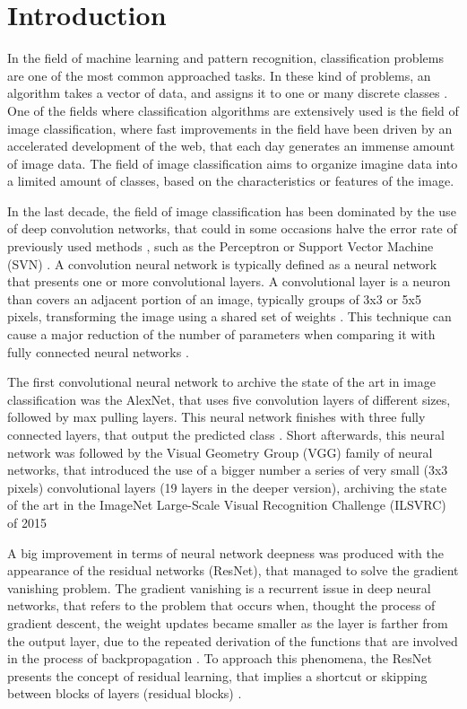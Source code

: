 \documentclass[11pt,onecolumn,titlepage,letterpaper]{article}
\begin{document}
\section{Introduction}

In the field of machine learning  and pattern recognition, classification problems are one of the most common approached tasks. In these kind of problems, an algorithm takes a vector of data, and assigns it to one or many discrete classes \cite{Bishop2006}. One of the fields where classification algorithms are extensively used is the field of image classification, where fast improvements in the field have been driven by an accelerated development of the web, that each day generates an immense amount of image data. The field of image classification aims to organize imagine data into a limited amount of classes, based on the characteristics or features of the image. \cite{Zhang2019}

In the last decade, the field of image classification has been dominated by the use of deep convolution networks, that could in some occasions halve the error rate of previously used methods \cite{Krizhevsky2017}, such as the Perceptron \cite{Rosenblatt1957} or Support Vector Machine (SVN) \cite{Vapnik1995}. A convolution neural network is typically defined as a neural network that presents one or more convolutional layers. A convolutional layer is a neuron than covers an adjacent portion of an image, typically groups of 3x3 or 5x5 pixels, transforming the image using a shared set of weights . This technique can cause a major reduction of the number of parameters when comparing it with fully connected neural networks \cite{Aghdam2017}.

The first convolutional neural network to archive the state of the art in image classification was the AlexNet, that uses five convolution layers of different sizes, followed by max pulling layers. This neural network finishes with three fully connected layers, that output the predicted class \cite{Krizhevsky2012}. Short afterwards, this neural network was followed by the Visual Geometry Group (VGG) family of neural networks, that introduced the use of a bigger number a series of very small (3x3 pixels) convolutional layers (19 layers in the deeper version), archiving the state of the art in the ImageNet Large-Scale Visual Recognition Challenge (ILSVRC) of 2015 \cite{Simonyan2015}

A big improvement in terms of neural network deepness was produced with the appearance of the residual networks (ResNet), that managed to solve the gradient vanishing problem. The gradient vanishing is a recurrent issue in deep neural networks, that refers to the problem that occurs when, thought the process of gradient descent, the weight updates became smaller as the layer is farther from the output layer, due to the repeated derivation of the functions that are involved in the process of backpropagation \cite{Aghdam2017,Skansi2018}. To approach this phenomena, the ResNet presents the concept of residual learning, that implies a shortcut or skipping between blocks of layers (residual blocks) \cite{He2016,He2016a}.
\end{document}
